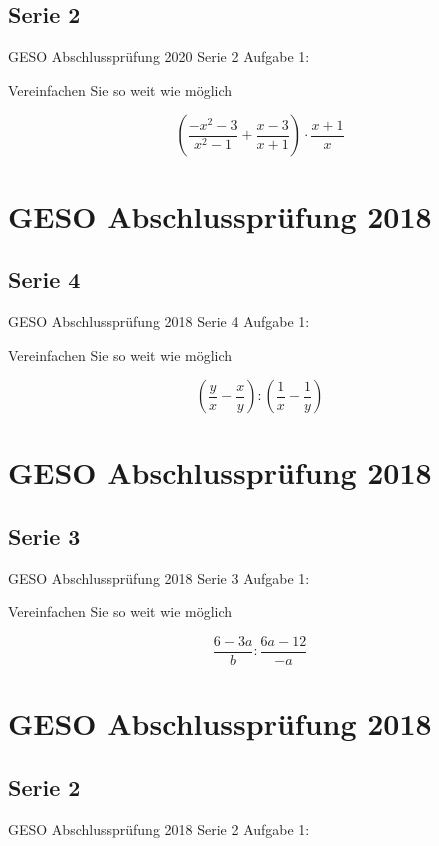 {\subsection*{Serie 2}
GESO Abschlussprüfung 2020 Serie 2 Aufgabe 1:

Vereinfachen Sie so weit wie möglich

$$\left( \frac{-x^2-3}{x^2-1} + \frac{x-3}{x+1} \right) \cdot{}  \frac{x+1}{x}$$




\section*{GESO Abschlussprüfung 2018}
\subsection*{Serie 4}
GESO Abschlussprüfung 2018 Serie 4 Aufgabe 1:

Vereinfachen Sie so weit wie möglich

$$\left( \frac{y}{x} - \frac{x}{y} \right) : \left( \frac1{x}  - \frac1{y}  \right)$$




\section*{GESO Abschlussprüfung 2018}
\subsection*{Serie 3}
GESO Abschlussprüfung 2018 Serie 3 Aufgabe 1:

Vereinfachen Sie so weit wie möglich

$$\frac{6-3a}{b} : \frac{6a-12}{-a}$$




\section*{GESO Abschlussprüfung 2018}
\subsection*{Serie 2}
GESO Abschlussprüfung 2018 Serie 2 Aufgabe 1:

}
